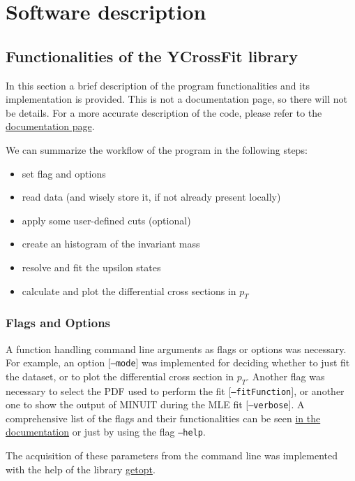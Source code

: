 \documentclass[a4paper,11pt]{article}
\begin{document}
\section{Software description}
\subsection{Functionalities of the YCrossFit library}
In this section a brief description of the program functionalities and its implementation is provided. This is not a documentation page, so there will not be details. For a more accurate description of the code, please refer to the \href{https://zenith378.github.io/Y-DiMuonResonances/html/index.html}{documentation page}.

We can summarize the workflow of the program in the following steps:
\begin{itemize}
    \item set flag and options
    \item read data (and wisely store it, if not already present locally)
    \item apply some user-defined cuts (optional)
    \item create an histogram of the invariant mass
    \item resolve and fit the upsilon states
    \item calculate and plot the differential cross sections in $p_T$
\end{itemize}

\subsubsection{Flags and Options}
A function handling command line arguments as flags or options was necessary. For example, an option [\texttt{--mode}] was implemented for deciding whether to just fit the dataset, or to plot the differential cross section in $p_T$. Another flag was necessary to select the PDF used to perform the fit [\texttt{--fitFunction}], or another one to show the output of MINUIT during the MLE fit [\texttt{--verbose}]. A comprehensive list of the flags and their functionalities can be seen  \href{https://zenith378.github.io/Y-DiMuonResonances/html/optionParse_8h.html#ae964ff8411b4fdcaf65cb5529aea4bef}{in the documentation} or just by using the flag \texttt{--help}.

The acquisition of these parameters from the command line was implemented with the help of the library \href{https://man7.org/linux/man-pages/man3/getopt.3.html}{getopt}.
\end{document}
